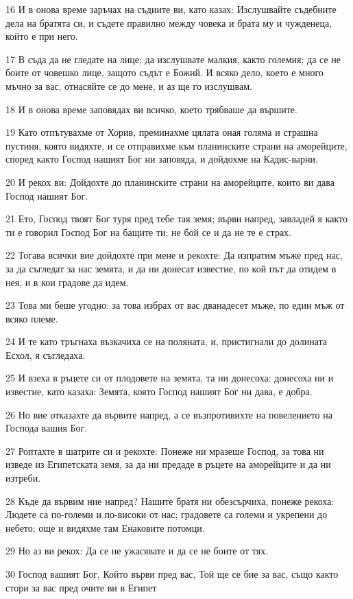 \par 16 И в онова време заръчах на съдиите ви, като казах: Изслушвайте съдебните дела на братята си, и съдете правилно между човека и брата му и чужденеца, който е при него.
\par 17 В съда да не гледате на лице; да изслушвате малкия, както големия; да се не боите от човешко лице, защото съдът е Божий. И всяко дело, което е много мъчно за вас, отнасяйте се до мене, и аз ще го изслушвам.
\par 18 И в онова време заповядах ви всичко, което трябваше да вършите.
\par 19 Като отпътувахме от Хорив, преминахме цялата оная голяма и страшна пустиня, която видяхте, и се отправихме към планинските страни на аморейците, според както Господ нашият Бог ни заповяда, и дойдохме на Кадис-варни.
\par 20 И рекох ви: Дойдохте до планинските страни на аморейците, които ви дава Господ нашият Бог.
\par 21 Ето, Господ твоят Бог туря пред тебе тая земя; върви напред, завладей я както ти е говорил Господ Бог на бащите ти; не бой се и да не те е страх.
\par 22 Тогава всички вие дойдохте при мене и рекохте: Да изпратим мъже пред нас, за да съгледат за нас земята, и да ни донесат известие, по кой път да отидем в нея, и в кои градове да идем.
\par 23 Това ми беше угодно: за това избрах от вас дванадесет мъже, по един мъж от всяко племе.
\par 24 И те като тръгнаха възкачиха се на поляната, и, пристигнали до долината Есхол, я съгледаха.
\par 25 И взеха в ръцете си от плодовете на земята, та ни донесоха: донесоха ни и известие, като казаха: Земята, която Господ нашият Бог ни дава, е добра.
\par 26 Но вие отказахте да вървите напред, а се възпротивихте на повелението на Господа вашия Бог.
\par 27 Роптахте в шатрите си и рекохте: Понеже ни мразеше Господ, за това ни изведе из Египетската земя, за да ни предаде в ръцете на аморейците и да ни изтреби.
\par 28 Къде да вървим ние напред? Нашите братя ни обезсърчиха, понеже рекоха: Людете са по-големи и по-високи от нас; градовете са големи и укрепени до небето; още и видяхме там Енаковите потомци.
\par 29 Но аз ви рекох: Да се не ужасявате и да се не боите от тях.
\par 30 Господ вашият Бог, Който върви пред вас, Той ще се бие за вас, също както стори за вас пред очите ви в Египет
